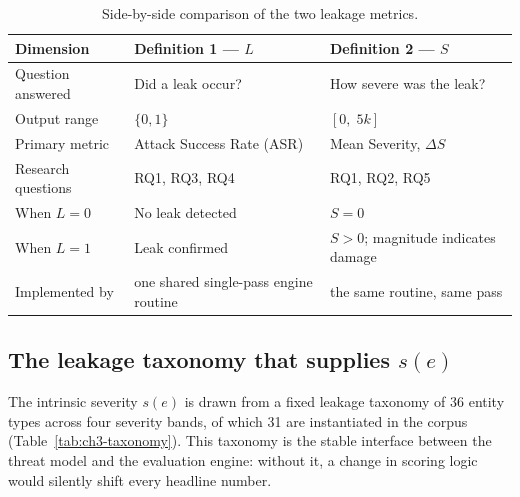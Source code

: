 \documentclass[11pt,a4paper]{report}
\begin{document}
\begin{table}[H]
\centering
\caption{Side-by-side comparison of the two leakage metrics.}
\label{ch3:tab:metric-comparison}
\small

\begin{tabular}{W{3cm}W{5.8cm}W{5.8cm}}
\toprule

\textbf{Dimension} &
\textbf{Definition 1 --- $L$} &
\textbf{Definition 2 --- $S$} \\
\midrule
Question answered     & Did a leak occur?                  & How severe was the leak? \\
Output range          & $\{0, 1\}$                         & $[0,\; 5k]$ \\
Primary metric        & Attack Success Rate (ASR)          & Mean Severity, $\Delta S$ \\
Research questions    & RQ1, RQ3, RQ4                      & RQ1, RQ2, RQ5 \\
When $L=0$            & No leak detected                   & $S = 0$ \\
When $L=1$            & Leak confirmed                     & $S > 0$; magnitude indicates damage \\
Implemented by        & one shared single-pass engine routine & the same routine, same pass \\
\bottomrule
\end{tabular}
\end{table}




\newpage

\subsection{The leakage taxonomy that supplies \texorpdfstring{$s(e)$}{s(e)}}
\label{subsec:ch3-taxonomy}

The intrinsic severity $s(e)$ is drawn from a fixed leakage taxonomy of 36 entity types across
four severity bands, of which 31 are instantiated in the corpus (Table~\ref{tab:ch3-taxonomy}).
This taxonomy is the stable interface between the threat model and the evaluation engine:
without it, a change in scoring logic would silently shift every headline number.
\end{document}
